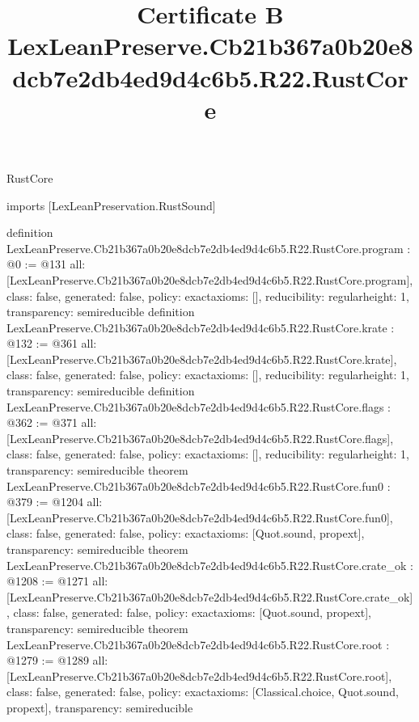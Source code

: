 \begin{lexlean}{RustCore}
\title{Certificate B LexLeanPreserve.Cb21b367a0b20e8dcb7e2db4ed9d4c6b5.R22.RustCore}
\begin{coremodule}
imports [LexLeanPreservation.RustSound]

definition LexLeanPreserve.Cb21b367a0b20e8dcb7e2db4ed9d4c6b5.R22.RustCore.program : @0 := @131 {
  all: [LexLeanPreserve.Cb21b367a0b20e8dcb7e2db4ed9d4c6b5.R22.RustCore.program],
  class: false,
  generated: false,
  policy: exact{axioms: []},
  reducibility: regular{height: 1},
  transparency: semireducible
}
definition LexLeanPreserve.Cb21b367a0b20e8dcb7e2db4ed9d4c6b5.R22.RustCore.krate : @132 := @361 {
  all: [LexLeanPreserve.Cb21b367a0b20e8dcb7e2db4ed9d4c6b5.R22.RustCore.krate],
  class: false,
  generated: false,
  policy: exact{axioms: []},
  reducibility: regular{height: 1},
  transparency: semireducible
}
definition LexLeanPreserve.Cb21b367a0b20e8dcb7e2db4ed9d4c6b5.R22.RustCore.flags : @362 := @371 {
  all: [LexLeanPreserve.Cb21b367a0b20e8dcb7e2db4ed9d4c6b5.R22.RustCore.flags],
  class: false,
  generated: false,
  policy: exact{axioms: []},
  reducibility: regular{height: 1},
  transparency: semireducible
}
theorem LexLeanPreserve.Cb21b367a0b20e8dcb7e2db4ed9d4c6b5.R22.RustCore.fun0 : @379 := @1204 {
  all: [LexLeanPreserve.Cb21b367a0b20e8dcb7e2db4ed9d4c6b5.R22.RustCore.fun0],
  class: false,
  generated: false,
  policy: exact{axioms: [Quot.sound, propext]},
  transparency: semireducible
}
theorem LexLeanPreserve.Cb21b367a0b20e8dcb7e2db4ed9d4c6b5.R22.RustCore.crate_ok : @1208 := @1271 {
  all: [LexLeanPreserve.Cb21b367a0b20e8dcb7e2db4ed9d4c6b5.R22.RustCore.crate_ok],
  class: false,
  generated: false,
  policy: exact{axioms: [Quot.sound, propext]},
  transparency: semireducible
}
theorem LexLeanPreserve.Cb21b367a0b20e8dcb7e2db4ed9d4c6b5.R22.RustCore.root : @1279 := @1289 {
  all: [LexLeanPreserve.Cb21b367a0b20e8dcb7e2db4ed9d4c6b5.R22.RustCore.root],
  class: false,
  generated: false,
  policy: exact{axioms: [Classical.choice, Quot.sound, propext]},
  transparency: semireducible
}


\end{coremodule}
\end{lexlean}
